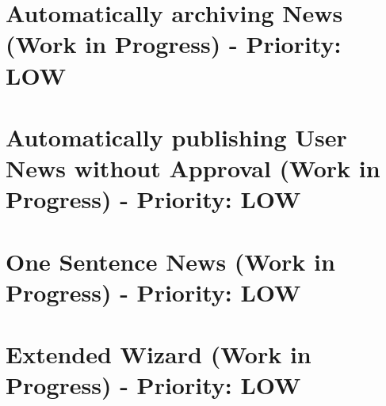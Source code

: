 \section{Automatically archiving News (Work in Progress) - Priority: LOW}



\section{Automatically publishing User News without Approval (Work in Progress) - Priority: LOW}



\section{One Sentence News (Work in Progress) - Priority: LOW}



\section{Extended Wizard (Work in Progress) - Priority: LOW}

